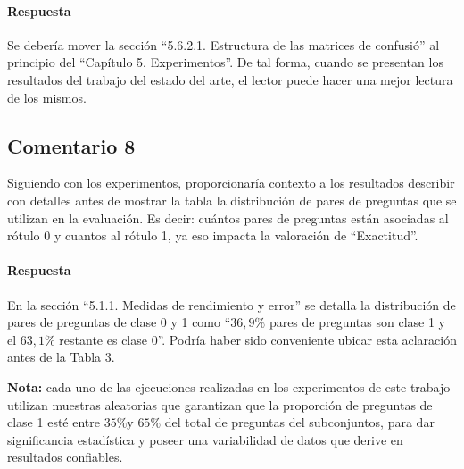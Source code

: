 \paragraph*{Respuesta}
Se debería mover la sección ``5.6.2.1. Estructura de las matrices de confusió'' al principio del ``Capítulo 5. Experimentos''. De tal forma, cuando se presentan los resultados del trabajo del estado del arte, el lector puede hacer una mejor lectura de los mismos.

\subsection*{Comentario 8}
Siguiendo con los experimentos, proporcionaría contexto a los resultados describir con detalles antes de mostrar la tabla la distribución de pares de preguntas que se utilizan en la evaluación. Es decir: cuántos pares de preguntas están asociadas al rótulo 0 y cuantos al rótulo 1, ya eso impacta la valoración de “Exactitud”.

\paragraph*{Respuesta}
En la sección ``5.1.1. Medidas de rendimiento y error'' se detalla la distribución de pares de preguntas de clase 0 y 1 como ``\(36,9\%\) pares de preguntas son clase 1 y el \(63,1\%\) restante es clase 0''. Podría haber sido conveniente ubicar esta aclaración antes de la Tabla 3.

\bigskip

\textbf{Nota:} cada uno de las ejecuciones realizadas en los experimentos de este trabajo utilizan muestras aleatorias que garantizan que la proporción de preguntas de clase 1 esté entre \(35\% \)y \(65\%\) del total de preguntas del subconjuntos, para dar significancia estadística y poseer una variabilidad de datos que derive en resultados confiables.

